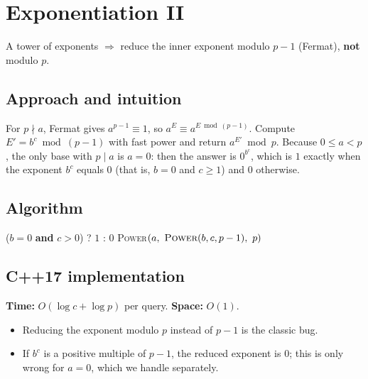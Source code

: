 \section{Exponentiation II}
\label{sec:n-exp2}


\begin{patternbox}
A tower of exponents $\Rightarrow$ reduce the inner exponent modulo
$p-1$ (Fermat), \textbf{not} modulo $p$.
\end{patternbox}

\subsection*{Approach and intuition}

For $p\nmid a$, Fermat gives $a^{p-1}\equiv1$, so $a^E\equiv a^{E\bmod(p-1)}$.
Compute $E'=b^c\bmod(p-1)$ with fast power and return $a^{E'}\bmod p$.
Because $0\le a<p$, the only base with $p\mid a$ is $a=0$: then the answer is
$0^{b^c}$, which is $1$ exactly when the exponent $b^c$ equals $0$ (that is,
$b=0$ and $c\ge1$) and $0$ otherwise.

\subsection*{Algorithm}
\begin{algorithmic}[1]
 \Return ($b=0$ \textbf{and} $c>0$) ? $1$ : $0$ \EndIf
\State \Return \textsc{Power}$(a,\ \textsc{Power}(b,c,p-1),\ p)$
\end{algorithmic}


\subsection*{C++17 implementation}

\begin{complexitybox}
\textbf{Time:} $O(\log c+\log p)$ per query. \textbf{Space:} $O(1)$.
\end{complexitybox}

\begin{pitfallbox}
\begin{itemize}
  \item Reducing the exponent modulo $p$ instead of $p-1$ is the classic bug.
  \item If $b^c$ is a positive multiple of $p-1$, the reduced exponent is
        $0$; this is only wrong for $a=0$, which we handle separately.
\end{itemize}
\end{pitfallbox}
